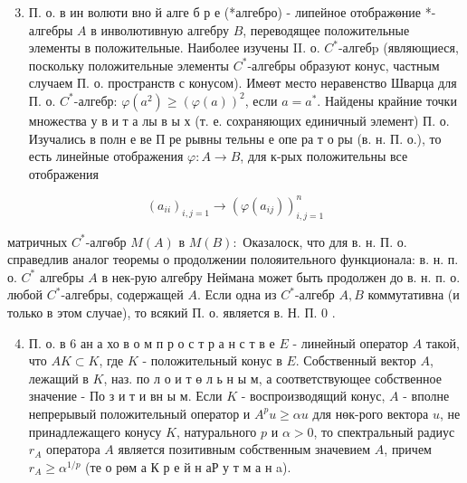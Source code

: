 \documentclass[10pt]{article}
\begin{document}
\begin{enumerate}

  \setcounter{enumi}{2}

  \item П. о. в ин волюти вно й алге б р е (*алгебро) - липейное отображөние *-алгебры $A$ в инволютивную алгебру $B$, переводящее положительные элементы в положительные. Наиболее изучены II. о. $C^{*}$-алгебp (являющиеся, поскольку положительные элементы $C^{*}$-алгебры образуют конус, частным случаем П. о. пространств с конусом). Имеөт место неравенство Шварца для П. о. $C^{*}$-алгебр: $\varphi\left(a^{2}\right) \geqslant(\varphi(a))^{2}$, если $a=a^{*}$. Найдены крайние точки множества у в и т а лы в ы х (т. е. сохраняющих единичный элемент) П. о. Изучались в полн е ве П ре рывны тельны е опе ра т о ры (в. н. П. о.), то есть линейные отображения $\varphi: A \rightarrow B$, для к-рых положительны все отображения

\end{enumerate}



\[

\left(a_{i i}\right)_{i, j=1} \longrightarrow\left(\varphi\left(a_{i j}\right)\right)_{i, j=1}^{n}

\]



матричных $C^{*}$-алгөбр $M(A)$ в $M(B):$ Оказалоск, что для в. н. П. о. справедлив аналог теоремы о продолжении полояительного функционала: в. н. п. о. $C^{*}$ алгебры $A$ в нек-рую алгебру Неймана может быть продолжен до в. н. п. о. любой $C^{*}$-алгебры, содержащей $A$. Если одна из $C^{*}$-алгебр $A, B$ коммутативна (и только в этом случае), то всякий П. о. является в. Н. П. 0 .



\begin{enumerate}

  \setcounter{enumi}{3}

  \item П. о. в 6 ан а хо в о м п р о с т р а н с т в е $E$ - линейный оператор $A$ такой, что $A K \subset K$, где $K$ - положительный конус в $E$. Собственный вектор $A$, лежащий в $K$, наз. по л о и т ө л ь н ы м, а соответствующее собственное значение - По з и т и вн ы м. Если $K$ - воспроизводящий конус, $A$ - вполне непрерывый положительный оператор и $A^{p} u \geqslant \alpha u$ для нөк-рого вектора $u$, не принадлежащего конусу $K$, натурального $p$ и $\alpha>0$, то спектральный радиус $r_{A}$ оператора $A$ является позитивным собственным значевием $A$, причем $r_{A} \geqslant \alpha^{1 / p}$ (те о рөм а $К$ р е й н аР у т м а н a).

\end{enumerate}
\end{document}
